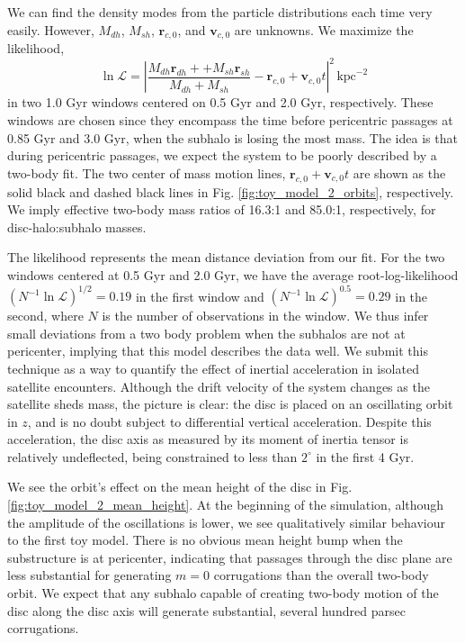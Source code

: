 We can find the density modes from the particle distributions each time very easily. However, $M_{dh}$, $M_{sh}$, $\textbf{r}_{c,0}$, and $\textbf{v}_{c,0}$ are unknowns. We maximize the likelihood,
\begin{equation}
\ln \mathcal{L} = \left\vert \frac{M_{dh}\textbf{r}_{dh} +  + M_{sh} \textbf{r}_{sh}}{M_{dh} + M_{sh}} - \textbf{r}_{c,0} + \textbf{v}_{c,0} t \right\vert^2 \, \text{kpc}^{-2}
\end{equation}
in two 1.0 Gyr windows  centered on 0.5 Gyr and 2.0 Gyr, respectively. These windows are chosen since they encompass the time before pericentric passages at 0.85 Gyr and 3.0 Gyr, when the subhalo is losing the most mass. The idea is that during pericentric passages, we expect the system to be poorly described by a two-body fit. The two center of mass motion lines, $\textbf{r}_{c,0} + \textbf{v}_{c,0} t$ are shown as the solid black and dashed black lines in Fig. \ref{fig:toy_model_2_orbits}, respectively. We imply effective two-body mass ratios of 16.3:1 and 85.0:1, respectively, for disc-halo:subhalo masses. 

The likelihood represents the mean distance deviation from our fit. For the two windows centered at 0.5 Gyr and 2.0 Gyr, we have the average root-log-likelihood $(N^{-1}\ln\mathcal{L})^{1/2}= 0.19$ in the first window and  $(N^{-1}\ln\mathcal{L})^{0.5} = 0.29$ in the second, where $N$ is the number of observations in the window. We thus infer small deviations from a two body problem when the subhalos are not at pericenter, implying that this model describes the data well.  We submit this technique as a way to quantify the effect of inertial acceleration in isolated satellite encounters. Although the drift velocity of the system changes as the satellite sheds mass, the picture is clear: the disc is placed on an oscillating orbit in $z$, and is no doubt subject to differential vertical acceleration. Despite this acceleration, the disc axis as measured by its moment of inertia tensor is relatively undeflected, being constrained to less than $2^{\circ}$ in the first 4 Gyr.


We see the orbit's effect on the mean height of the disc in Fig. \ref{fig:toy_model_2_mean_height}. At the beginning of the simulation, although the amplitude of the oscillations is lower, we see qualitatively similar behaviour to the first toy model. There is no obvious mean height bump when the substructure is at pericenter, indicating that passages through the disc plane are less substantial for generating $m=0$ corrugations than the overall two-body orbit. We expect that any subhalo capable of creating two-body motion of the disc along the disc axis will generate substantial, several hundred parsec corrugations. 


